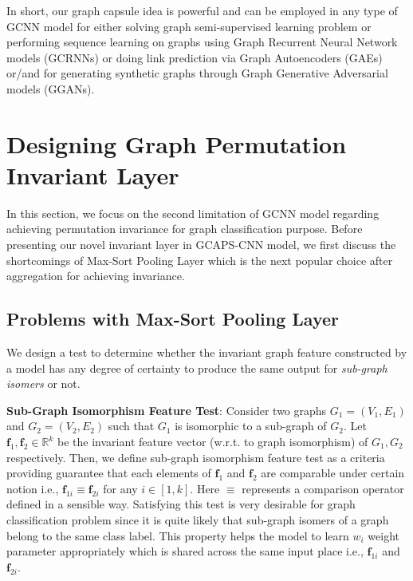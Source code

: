 \documentclass{article}
\begin{document}
In short, our graph capsule idea is powerful  and can be employed in any type of GCNN model for either solving graph semi-supervised learning problem or performing sequence learning on graphs using Graph Recurrent Neural Network models (GCRNNs) or doing link prediction via Graph Autoencoders (GAEs) or/and for generating synthetic graphs through Graph Generative Adversarial models (GGANs).



\section{Designing Graph Permutation Invariant Layer}\label{sec:permutation_inv}

In this section, we focus on the second limitation of GCNN model regarding achieving permutation invariance for graph classification purpose. Before presenting  our novel invariant layer in   GCAPS-CNN model, we first discuss the shortcomings of Max-Sort Pooling Layer which is the next popular choice after aggregation for achieving invariance.

\subsection{Problems with Max-Sort Pooling Layer}\label{sec:max-issue}

We design a test to determine whether the invariant graph feature constructed by a model has any degree of certainty  to produce the same output for \emph{sub-graph isomers} or not. 

\noindent \textbf{Sub-Graph Isomorphism Feature Test}: Consider two graphs $G_1=(V_1,E_1)$ and $G_2=(V_2,E_2)$ such that $G_1$ is isomorphic to a sub-graph of $G_2$. Let $\mathbf{f}_1,\mathbf{f}_2 \in \mathbb{R}^k$   be the invariant feature vector (w.r.t. to graph isomorphism) of $G_1, G_2$ respectively. Then, we define sub-graph isomorphism feature test as a criteria providing guarantee that each elements of $\mathbf{f}_1$ and $\mathbf{f}_2$ are comparable under certain notion i.e., $\mathbf{f}_{1i} \equiv \mathbf{f}_{2i}$ for any $i \in [1, k]$. Here  $\equiv$  represents a comparison operator defined in a sensible way. Satisfying this test is  very desirable for graph classification problem since it is quite likely that sub-graph isomers of a graph belong to the same class label. This property helps the model to  learn  $w_i$ weight parameter appropriately which is shared     across the  same input place i.e., $\mathbf{f}_{1i}$ and  $\mathbf{f}_{2i}$.
\end{document}

